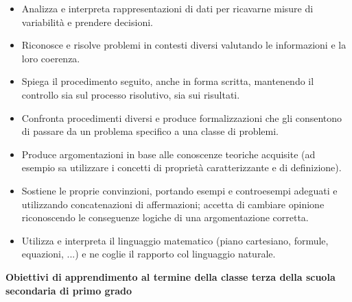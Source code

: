 \documentclass[12pt]{report}
\begin{document}
\begin{itemize}
\item Analizza e interpreta rappresentazioni di dati per ricavarne misure di variabilità e prendere decisioni.

\item Riconosce e risolve problemi in contesti diversi valutando le informazioni e la loro coerenza.

\item Spiega il procedimento seguito, anche in forma scritta, mantenendo il controllo sia sul processo risolutivo, sia sui risultati.

\item Confronta procedimenti diversi e produce formalizzazioni che gli consentono di passare da un problema specifico a una classe di problemi.  

\item Produce argomentazioni in base alle conoscenze teoriche acquisite (ad esempio sa utilizzare i concetti di proprietà caratterizzante e di definizione).

\item Sostiene le proprie convinzioni, portando esempi e controesempi adeguati e utilizzando concatenazioni di affermazioni; accetta di cambiare opinione riconoscendo le conseguenze logiche di una argomentazione corretta.

\item Utilizza e interpreta il linguaggio matematico (piano cartesiano, formule, equazioni, ...) e ne coglie il rapporto col linguaggio naturale.
\end{itemize}

\medskip
\noindent \textbf{Obiettivi di apprendimento al termine della classe terza della scuola secondaria di primo grado}
\end{document}
